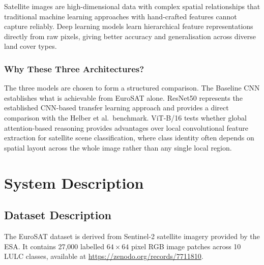 \documentclass[12pt, letterpaper]{article}
\begin{document}
Satellite images are high-dimensional data with complex spatial relationships that traditional machine learning approaches with hand-crafted features cannot capture reliably. Deep learning models learn hierarchical feature representations directly from raw pixels, giving better accuracy and generalisation across diverse land cover types.

\subsubsection{Why These Three Architectures?}

The three models are chosen to form a structured comparison. The Baseline CNN
establishes what is achievable from EuroSAT alone. ResNet50 represents the established CNN-based transfer learning approach and provides a direct comparison with the Helber et al.\ benchmark. ViT-B/16 tests whether global attention-based reasoning provides advantages over local convolutional feature extraction for satellite scene classification, where class identity often depends on spatial layout across the whole image rather than any single local region.

\section{System Description}

\subsection{Dataset Description}

The EuroSAT dataset \cite{helber2019eurosat} is derived from Sentinel-2 satellite imagery provided by the ESA. It contains 27,000 labelled $64 \times 64$ pixel RGB image patches across 10 LULC classes, available at
\url{https://zenodo.org/records/7711810}.
\end{document}
